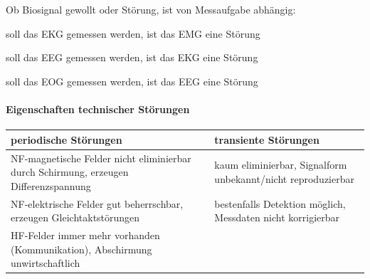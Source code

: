 \documentclass[a4paper]{article}
\begin{document}
\begin{multicols}{3}
  Ob Biosignal gewollt oder Störung, ist von Messaufgabe abhängig:
  \begin{itemize*}
    \item soll das EKG gemessen werden, ist das EMG eine Störung
    \item soll das EEG gemessen werden, ist das EKG eine Störung
    \item soll das EOG gemessen werden, ist das EEG eine Störung
  \end{itemize*}



  \paragraph{Eigenschaften technischer Störungen}
  \begin{tabular}{p{4cm}|p{4cm}}
    periodische Störungen                                                                & transiente Störungen                                         \\\hline
    NF-magnetische Felder nicht eliminierbar durch Schirmung, erzeugen Differenzspannung & kaum eliminierbar, Signalform unbekannt/nicht reproduzierbar \\\hline
    NF-elektrische Felder gut beherrschbar, erzeugen Gleichtaktstörungen                 & bestenfalls Detektion möglich, Messdaten nicht korrigierbar  \\\hline
    HF-Felder immer mehr vorhanden (Kommunikation), Abschirmung unwirtschaftlich         &                                                              \\
  \end{tabular}


\end{multicols}
\end{document}
